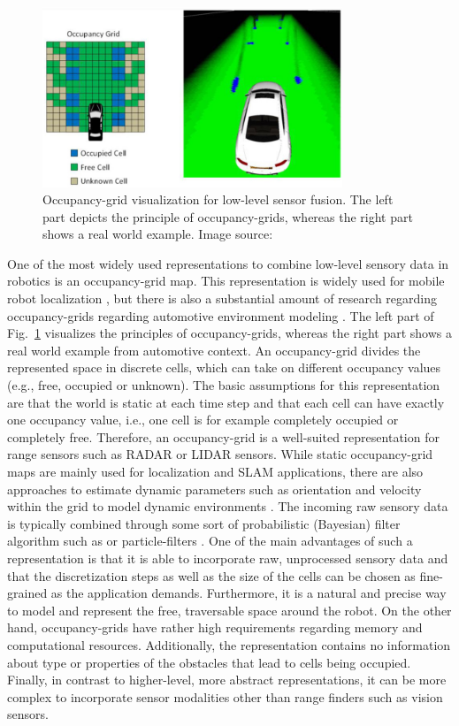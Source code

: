 \begin{figure}[t!]
	\centering
	\includegraphics[width=0.8\textwidth]{imgs/occupancy_grid_principle.png}
    \caption{Occupancy-grid visualization for low-level sensor fusion. The left part depicts the principle of occupancy-grids, whereas the right part shows a real world example. Image source: \textcite{Hohm2014}}
	\label{fig:occupancy-grid}
\end{figure}

One of the most widely used representations to combine low-level sensory data in robotics is an occupancy-grid map.
This representation is widely used for mobile robot localization \parencite{Thrun2005}, but there is also a substantial amount of research regarding occupancy-grids regarding automotive environment modeling  \parencite{Tanzmeister2014, Steyer2018}.
The left part of Fig.~\ref{fig:occupancy-grid} visualizes the principles of occupancy-grids, whereas the right part shows a real world example from automotive context.
An occupancy-grid divides the represented space in discrete cells, which can take on different occupancy values (e.g., free, occupied or unknown).
The basic assumptions for this representation are that the world is static at each time step and that each cell can have exactly one occupancy value, i.e., one cell is for example completely occupied or completely free.
Therefore, an occupancy-grid is a well-suited representation for range sensors such as \ac{RADAR} or \ac{LIDAR} sensors.
While static occupancy-grid maps are mainly used for localization and \ac{SLAM} applications, there are also approaches to estimate dynamic parameters such as orientation and velocity within the grid to model dynamic environments \parencite{Tanzmeister2014}.
The incoming raw sensory data is typically combined through some sort of probabilistic (Bayesian) filter algorithm such as \textcite{Kalman1960} or particle-filters \parencite{Gordon1993}.
One of the main advantages of such a representation is that it is able to incorporate raw, unprocessed sensory data and that the discretization steps as well as the size of the cells can be chosen as fine-grained as the application demands.
Furthermore, it is a natural and precise way to model and represent the free, traversable space around the robot.
On the other hand, occupancy-grids have rather high requirements regarding memory and computational resources.
Additionally, the representation contains no information about type or properties of the obstacles that lead to cells being occupied.
Finally, in contrast to higher-level, more abstract representations, it can be more complex to incorporate sensor modalities other than range finders such as vision sensors.

